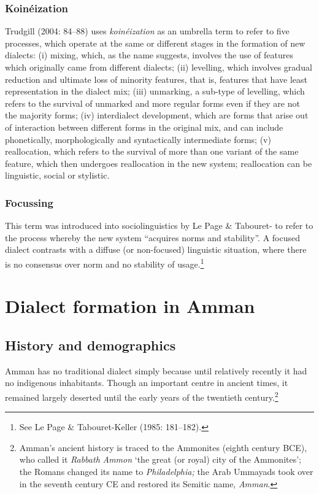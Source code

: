 \documentclass[output=paper]{langsci/langscibook}
\begin{document}
\subsubsection{Koinéization}

Trudgill (2004: 84–88) uses \textit{koinéization} as an umbrella term to refer to five processes, which operate at the same or different stages in the formation of new dialects: (i) mixing, which, as the name suggests, involves the use of features which originally came from different dialects; (ii) levelling, which involves gradual reduction and ultimate loss of minority features, that is, features that have least representation in the dialect mix; (iii) unmarking, a sub-type of levelling, which refers to the survival of unmarked and more regular forms even if they are not the majority forms; (iv) interdialect development, which are forms that arise out of interaction between different forms in the original mix, and can include phonetically, morphologically and syntactically  intermediate forms; (v) reallocation, which refers to the survival of more than one variant of the same feature, which then undergoes reallocation in the new system; reallocation can be linguistic, social or stylistic.

\subsubsection{Focussing} \label{focuss}

This term was introduced into sociolinguistics by Le Page \& Tabouret-\citet{Keller1985} to refer to the process whereby the new system “acquires norms and stability”. A focused dialect contrasts with a diffuse (or non-focused) linguistic situation, where there is no consensus over norm and no stability of usage.\footnote{See Le Page \& Tabouret-Keller (1985: 181–182).}

\section{Dialect formation in Amman}

\subsection{History and demographics}

Amman has no traditional dialect simply because until relatively recently it had no indigenous inhabitants. Though an important centre in ancient times, it remained largely deserted until the early years of the twentieth century.\footnote{Amman’s ancient history is traced to the Ammonites (eighth century BCE), who called it \textit{Rabbath} \textit{Ammon} ‘the great (or royal) city of the Ammonites’; the Romans changed its name to \textit{Philadelphia;} the Arab Ummayads took over in the seventh century CE and restored its Semitic name, \textit{Amman}.}
\end{document}

